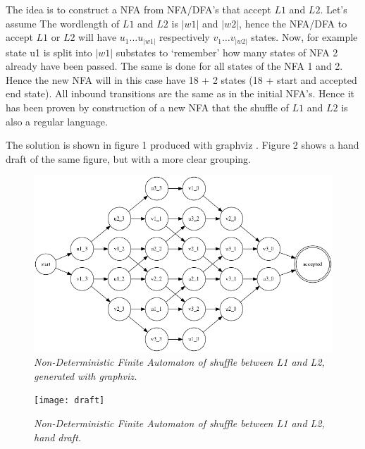 \documentclass[a4paper,11pt,twoside]{article}
\begin{document}
The idea is to construct a NFA from NFA/DFA's that accept $L1$ and $L2$. Let's assume The wordlength of $L1$ and $L2$ is $|w1|$ and $|w2|$, hence the NFA/DFA to accept $L1$ or $L2$ will have $u_{1} \ldots u_{|w1|}$ respectively $v_{1} \ldots v_{|w2|}$ states. Now, for example state u1 is split into $|w1|$ substates to `remember' how many states of NFA 2 already have been passed. The same is done for all states of the NFA 1 and 2. Hence the new NFA will in this case have 18 + 2 states (18 + start and accepted end state). All inbound transitions are the same as in the initial NFA's. Hence it has been proven by construction of a new NFA that the shuffle of $L1$ and $L2$ is also a regular language.

The solution is shown in figure 1 produced with graphviz \cite{graphviz}. Figure 2 shows a hand draft of the same figure, but with a more clear grouping.

\begin{figure}
  \centering
  \includegraphics[width=\textwidth]{graph}
  \caption{\textit{Non-Deterministic Finite Automaton of shuffle between L1 and L2, generated with graphviz.}}
  \label{fig:graph}
\end{figure}

\begin{figure}
  \centering
  \texttt{[image: draft]}
  \caption{\textit{Non-Deterministic Finite Automaton of shuffle between L1 and L2, hand draft.}}
  \label{fig:graph}
\end{figure}


\end{document}
